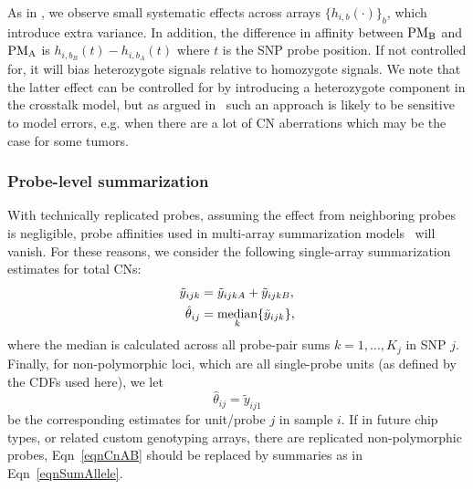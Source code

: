 \documentclass{bioinfo}
\newcommand{\GWS}{GWS\xspace}
\newcommand{\PMA}{\ensuremath{\textnormal{PM}_\textnormal{A}}\xspace}
\newcommand{\PMB}{\ensuremath{\textnormal{PM}_\textnormal{B}}\xspace}
\DeclareMathOperator{\median}{\textnormal{median}}
\begin{document}
As in \citet{CarvalhoB_etal_2006}, we observe small systematic effects across arrays $\{h_{i,b}(\cdot)\}_b$, which introduce extra variance.  In addition, the difference in affinity between \PMB and \PMA is $h_{i,b_B}(t) - h_{i,b_A}(t)$ where $t$ is the SNP probe position.  If not controlled for, it will bias heterozygote signals relative to homozygote signals. 
We note that the latter effect can be controlled for by introducing a heterozygote component in the crosstalk model, but as argued in~\citet{BengtssonH_etal_2008a} such an approach is likely to be sensitive to model errors, e.g. when there are a lot of CN aberrations which may be the case for some tumors.


\subsubsection{Probe-level summarization}
\label{secSummarizationModel}
With technically replicated probes, assuming the effect from neighboring probes is negligible, probe affinities used in multi-array summarization models~\citep{BengtssonH_etal_2008a} will vanish.
For these reasons, we consider the following single-array summarization estimates for total CNs:
\begin{align}
  \tilde{y}_{ijk} &= \tilde{y}_{ijkA} + \tilde{y}_{ijkB}, \notag \\
  \hat{\theta}_{ij} &= \median_{k} \{\tilde{y}_{ijk}\},
  \label{eqnSumAllele}
\end{align}
where the median is calculated across all probe-pair sums $k=1,\ldots,K_j$ in SNP $j$.
Finally, for non-polymorphic loci, which are all single-probe units (as defined by the CDFs used here), we let
\begin{equation}
  \hat{\theta}_{ij} = \tilde{y}_{ij1}
  \label{eqnCnAB}
\end{equation}
be the corresponding estimates for unit/probe $j$ in sample $i$.  If in future chip types, or related custom genotyping arrays, there are replicated non-polymorphic probes, Eqn~\eqref{eqnCnAB} should be replaced by summaries as in Eqn~\eqref{eqnSumAllele}.  
\end{document}
